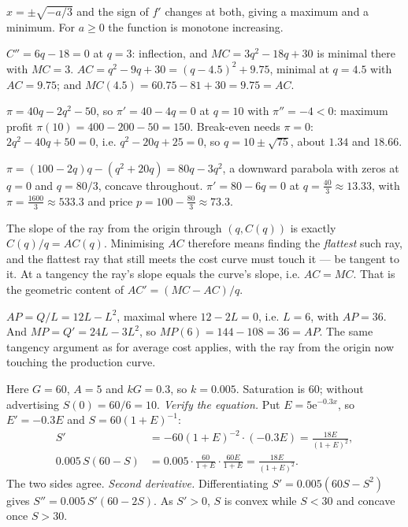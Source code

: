 \begin{solutions}
        $x=\pm\sqrt{-a/3}$ and the sign of $f'$ changes at both, giving a
        maximum and a minimum. For $a\ge0$ the function is monotone
        increasing.
  \item $C''=6q-18=0$ at $q=3$: inflection, and $MC=3q^{2}-18q+30$ is
        minimal there with $MC=3$. $AC=q^{2}-9q+30=(q-4.5)^{2}+9.75$,
        minimal at $q=4.5$ with $AC=9.75$; and
        $MC(4.5)=60.75-81+30=9.75=AC$.
  \item $\pi=40q-2q^{2}-50$, so $\pi'=40-4q=0$ at $q=10$ with
        $\pi''=-4<0$: maximum profit $\pi(10)=400-200-50=150$. Break-even
        needs $\pi=0$: $2q^{2}-40q+50=0$, i.e. $q^{2}-20q+25=0$, so
        $q=10\pm\sqrt{75}$, about $1.34$ and $18.66$.
  \item $\pi=(100-2q)q-(q^{2}+20q)=80q-3q^{2}$, a downward parabola with
        zeros at $q=0$ and $q=80/3$, concave throughout. $\pi'=80-6q=0$ at
        $q=\tfrac{40}{3}\approx13.33$, with
        $\pi=\tfrac{1600}{3}\approx533.3$ and price
        $p=100-\tfrac{80}{3}\approx73.3$.
  \item The slope of the ray from the origin through $(q,C(q))$ is exactly
        $C(q)/q=AC(q)$. Minimising $AC$ therefore means finding the
        \emph{flattest} such ray, and the flattest ray that still meets the
        cost curve must touch it --- be tangent to it. At a tangency the
        ray's slope equals the curve's slope, i.e. $AC=MC$. That is the
        geometric content of $AC'=(MC-AC)/q$.
  \item $AP=Q/L=12L-L^{2}$, maximal where $12-2L=0$, i.e. $L=6$, with
        $AP=36$. And $MP=Q'=24L-3L^{2}$, so $MP(6)=144-108=36=AP$. The
        same tangency argument as for average cost applies, with the ray
        from the origin now touching the production curve.
  \item Here $G=60$, $A=5$ and $kG=0.3$, so $k=0.005$. Saturation is
        $60$; without advertising $S(0)=60/6=10$.
        \emph{Verify the equation.} Put $E=5\mathrm{e}^{-0.3x}$, so
        $E'=-0.3E$ and $S=60(1+E)^{-1}$:
        \[\begin{aligned}
          S'&=-60(1+E)^{-2}\cdot(-0.3E)=\frac{18E}{(1+E)^{2}},\\
          0.005\,S(60-S)&=0.005\cdot\frac{60}{1+E}\cdot\frac{60E}{1+E}
          =\frac{18E}{(1+E)^{2}} .
        \end{aligned}\]
        The two sides agree. \emph{Second derivative.} Differentiating
        $S'=0.005(60S-S^{2})$ gives $S''=0.005\,S'(60-2S)$. As $S'>0$,
        $S$ is convex while $S<30$ and concave once $S>30$.

\end{solutions}
